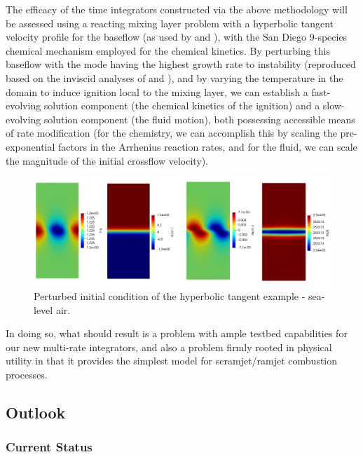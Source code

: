 The efficacy of the time integrators constructed via the above methodology will
be assessed using a reacting mixing layer problem with a hyperbolic tangent velocity profile
for the baseflow (as used by \cite{michalke1964inviscid} and \cite{blumen1970shear}), with
the San Diego 9-species chemical mechanism \cite{sandiego} employed for the chemical kinetics. By perturbing
this baseflow with the mode having the highest growth rate to instability (reproduced based
on the inviscid analyses of \cite{michalke1964inviscid} and \cite{blumen1970shear}), and by
varying the temperature in the domain to induce ignition local to the mixing layer, we can
establish a fast-evolving solution component (the chemical kinetics of the ignition) and a
slow-evolving solution component (the fluid motion), both possessing accessible
means of rate modification (for the chemistry, we can accomplish this by scaling the
pre-exponential factors in the Arrhenius reaction rates, and for the fluid, we can scale
the magnitude of the initial crossflow velocity).
\begin{figure}
\centering
\includegraphics[width=0.8\linewidth,trim=4 4 4 4,clip]{figures/hyperbolic_tangent_air.png}
\caption{Perturbed initial condition of the hyperbolic tangent example - sea-level air.}
\label{fig:hyperbolic_cold_rhov2}
\end{figure}
In doing so, what should result is a problem with ample testbed capabilities for our
new multi-rate integrators, and also a problem firmly rooted in physical utility in that
it provides the simplest model for scramjet/ramjet combustion processes.

\subsection{Outlook}

\subsubsection{Current Status}

